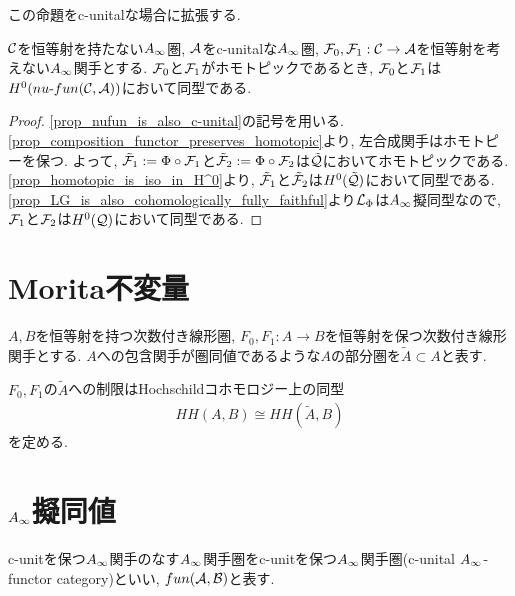 \documentclass[uplatex, a4paper, 14Q, dvipdfmx]{jsarticle}
\begin{document}
この命題をc-unitalな場合に拡張する.

\begin{theorem}
  $\mathcal{C}$を恒等射を持たない$A_{\infty}$圏, $\mathcal{A}$をc-unitalな$A_{\infty}$圏, $\mathcal{F}_0,\mathcal{F}_1 : \mathcal{C} \to \mathcal{A}$を恒等射を考えない$A_{\infty}$関手とする. 
  $\mathcal{F}_0$と$\mathcal{F}_1$がホモトピックであるとき, $\mathcal{F}_0$と$\mathcal{F}_1$は$H^0(nu \text{-} fun (\mathcal{C}, \mathcal{A}))$において同型である. 
\end{theorem}

\begin{proof}
  \cref{prop_nufun_is_also_c-unital}の記号を用いる. 
  \cref{prop_composition_functor_preserves_homotopic}より, 左合成関手はホモトピーを保つ. 
  よって, $\tilde{\mathcal{F}}_1 : = \Phi \circ \mathcal{F}_1$と$\tilde{\mathcal{F}}_2 := \Phi \circ \mathcal{F}_2$は$\tilde{\mathcal{Q}}$においてホモトピックである.
  \cref{prop_homotopic_is_iso_in_H^0}より, $\tilde{\mathcal{F}}_1$と$\tilde{\mathcal{F}}_2$は$H^0(\tilde{\mathcal{Q}})$において同型である. 
  \cref{prop_LG_is_also_cohomologically_fully_faithful}より$\mathcal{L}_\Phi$は$A_{\infty}$擬同型なので, $\mathcal{F}_1$と$\mathcal{F}_2$は$H^0(\mathcal{Q})$において同型である. 
\end{proof}

\section{Morita不変量}

$A,B$を恒等射を持つ次数付き線形圏, $F_0,F_1 : A \to B$を恒等射を保つ次数付き線形関手とする.
$A$への包含関手が圏同値であるような$A$の部分圏を$\tilde{A} \subset A$と表す. 

\begin{lemma} \label{prop_restriction_induces_iso_of_Hochschild}
  $F_0,F_1$の$\tilde{A}$への制限はHochschildコホモロジー上の同型
  \begin{align*}
    HH(A,B) \cong HH(\tilde{A},B)
  \end{align*}
  を定める. 
\end{lemma}


  

\section{\texorpdfstring{$A_{\infty}$}{Ainf}擬同値}

\begin{definition}
  c-unitを保つ$A_{\infty}$関手のなす$A_{\infty}$関手圏をc-unitを保つ$A_{\infty}$関手圏(c-unital $A_{\infty}$-functor category)といい, $fun (\mathcal{A}, \mathcal{B})$と表す. 
\end{definition}
\end{document}
